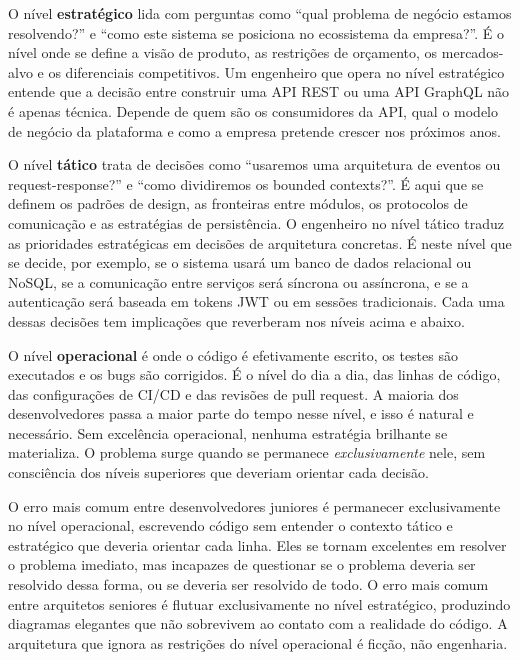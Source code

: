 O nível \textbf{estratégico} lida com perguntas como ``qual problema de
negócio estamos resolvendo?'' e ``como este sistema se posiciona no
ecossistema da empresa?''. É o nível onde se define a visão de produto,
as restrições de orçamento, os mercados-alvo e os diferenciais
competitivos. Um engenheiro que opera no nível estratégico entende que
a decisão entre construir uma API REST ou uma API GraphQL não é apenas
técnica. Depende de quem são os consumidores da API, qual o modelo
de negócio da plataforma e como a empresa pretende crescer nos próximos
anos.

O nível \textbf{tático} trata de decisões como ``usaremos uma arquitetura
de eventos ou request-response?'' e ``como dividiremos os bounded
contexts?''. É aqui que se definem os padrões de design, as fronteiras
entre módulos, os protocolos de comunicação e as estratégias de
persistência. O engenheiro no nível tático traduz as prioridades
estratégicas em decisões de arquitetura concretas. É neste nível que se
decide, por exemplo, se o sistema usará um banco de dados relacional ou
NoSQL, se a comunicação entre serviços será síncrona ou assíncrona, e se
a autenticação será baseada em tokens JWT ou em sessões tradicionais.
Cada uma dessas decisões tem implicações que reverberam nos níveis acima
e abaixo.

O nível \textbf{operacional} é onde o código é efetivamente escrito, os
testes são executados e os bugs são corrigidos. É o nível do dia a dia,
das linhas de código, das configurações de CI/CD e das revisões de pull
request. A maioria dos desenvolvedores passa a maior parte do tempo nesse
nível, e isso é natural e necessário. Sem excelência operacional,
nenhuma estratégia brilhante se materializa. O problema surge quando se
permanece \emph{exclusivamente} nele, sem consciência dos níveis
superiores que deveriam orientar cada decisão.

O erro mais comum entre desenvolvedores juniores é permanecer
exclusivamente no nível operacional, escrevendo código sem entender o
contexto tático e estratégico que deveria orientar cada linha. Eles se
tornam excelentes em resolver o problema imediato, mas incapazes de
questionar se o problema deveria ser resolvido dessa forma, ou se
deveria ser resolvido de todo. O erro mais comum entre arquitetos
seniores é flutuar exclusivamente no nível estratégico, produzindo
diagramas elegantes que não sobrevivem ao contato com a realidade do
código. A arquitetura que ignora as restrições do nível operacional é
ficção, não engenharia.

